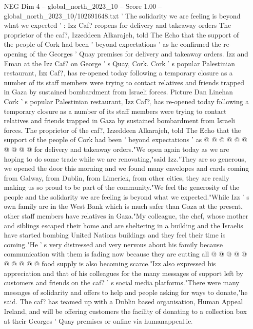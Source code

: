 \begin{textsample}{NEG Dim 4 – global\_north\_2023\_10 – Score 1.00 – global\_north\_2023\_10/102691648.txt}  \label{ex:f4_neg_015}
' The solidarity we are feeling is beyond what we expected ' : Izz Caf? reopens for delivery and takeaway orders The proprietor of the caf?, Izzeddeen Alkarajeh, told The Echo that the support of the people of Cork had been ' beyond expectations ' as he confirmed the re-opening of the Georges ' Quay premises for delivery and takeaway orders.
Izz and Eman at the Izz Caf? on George ' s Quay, Cork.
Cork ' s popular Palestinian restaurant, Izz Caf?, has re-opened today following a temporary closure as a number of its staff members were trying to contact relatives and friends trapped in Gaza by sustained bombardment from Israeli forces.
Picture Dan Linehan Cork ' s popular Palestinian restaurant, Izz Caf?, has re-opened today following a temporary closure as a number of its staff members were trying to contact relatives and friends trapped in Gaza by sustained bombardment from Israeli forces.
The proprietor of the caf?, Izzeddeen Alkarajeh, told The Echo that the support of the people of Cork had been ' beyond expectations ' as @ @ @ @ @ @ @ @ @ @ for delivery and takeaway orders."We open again today as we are hoping to do some trade while we are renovating,"said Izz."They are so generous, we opened the door this morning and we found many envelopes and cards coming from Galway, from Dublin, from Limerick, from other cities, they are really making us so proud to be part of the community."We feel the generosity of the people and the solidarity we are feeling is beyond what we expected."While Izz ' s own family are in the West Bank which is much safer than Gaza at the present, other staff members have relatives in Gaza."My colleague, the chef, whose mother and siblings escaped their home and are sheltering in a building and the Israelis have started bombing United Nations buildings and they feel their time is coming."He ' s very distressed and very nervous about his family because communication with them is fading now because they are cutting all @ @ @ @ @ @ @ @ @ @ food supply is also becoming scarce."Izz also expressed his appreciation and that of his colleagues for the many messages of support left by customers and friends on the caf? ' s social media platforms."There were many messages of solidarity and offers to help and people asking for ways to donate,"he said.
The caf? has teamed up with a Dublin based organisation, Human Appeal Ireland, and will be offering customers the facility of donating to a collection box at their Georges ' Quay premises or online via humanappeal.ie.

\end{textsample}
